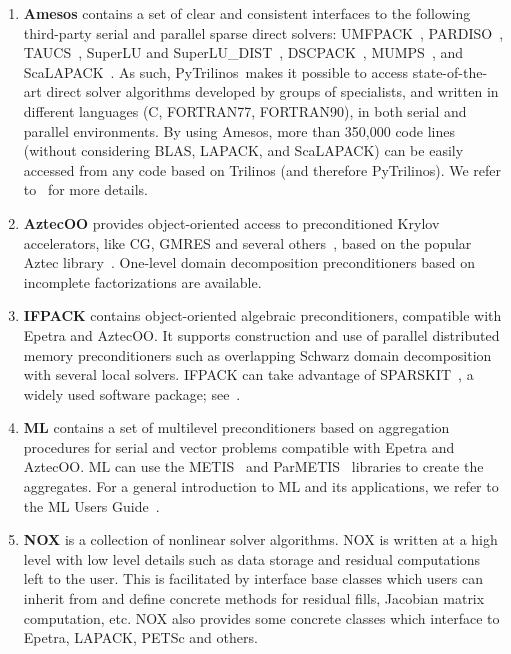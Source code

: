 \documentclass[acmtocl]{acmtrans2m}
\newcommand{\PyTrilinos}{{PyTrilinos}}
\begin{document}
\begin{enumerate}
\item {\bf Amesos} contains a set of clear and consistent interfaces
  to the following third-party serial and parallel sparse direct
  solvers: UMFPACK~\cite{umfpack-acm-toms},
  PARDISO~\cite{oskl:04-etna,sg:04-fgcs},
  TAUCS~\cite{rozin04locality,rotkin04design,irony04parallel}, SuperLU
  and SuperLU\_DIST~\cite{superlu-manual},
  DSCPACK~\cite{dscpack-manual}, MUMPS~\cite{mumps-manual}, and
  ScaLAPACK~\cite{scalapack-book,scalapack}.  As such,
  \PyTrilinos\ makes it possible to access state-of-the-art direct
  solver algorithms developed by groups of specialists, and written in
  different languages (C, FORTRAN77, FORTRAN90), in both serial and
  parallel environments.  By using Amesos, more than 350,000 code
  lines (without considering BLAS, LAPACK, and ScaLAPACK) can be
  easily accessed from any code based on Trilinos (and therefore
  \PyTrilinos).  We refer
  to~\cite{Amesos-Reference-Guide,Amesos-Design} for more details.

\item {\bf AztecOO} provides object-oriented access to preconditioned
  Krylov accelerators, like CG, GMRES and several
  others~\cite{golub96matrix}, based on the popular Aztec
  library~\cite{aztecoo-guide}.  One-level domain decomposition
  preconditioners based on incomplete factorizations are available.

\item {\bf IFPACK} contains object-oriented algebraic preconditioners,
  compatible with Epetra and AztecOO.  It supports construction and
  use of parallel distributed memory preconditioners such as
  overlapping Schwarz domain decomposition with several local solvers.
  IFPACK can take advantage of SPARSKIT~\cite{sparskit}, a widely used
  software package; see~\cite{ifpack-guide}.

\item {\bf ML} contains a set of multilevel preconditioners based on
  aggregation procedures for serial and vector problems compatible
  with Epetra and AztecOO.  ML can use the METIS~\cite{metis} and
  ParMETIS~\cite{parmetis} libraries to create the aggregates.  For a
  general introduction to ML and its applications, we refer to the ML
  Users Guide~\cite{ml-guide}.

\item {\bf NOX} is a collection of nonlinear solver algorithms.  NOX
  is written at a high level with low level details such as data
  storage and residual computations left to the user.  This is
  facilitated by interface base classes which users can inherit from
  and define concrete methods for residual fills, Jacobian matrix
  computation, etc.  NOX also provides some concrete classes which
  interface to Epetra, LAPACK, PETSc and others.


\end{enumerate}
\end{document}
